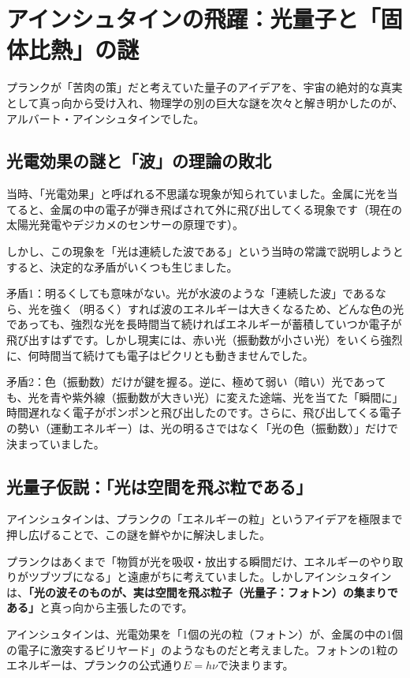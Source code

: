 \section{アインシュタインの飛躍：光量子と「固体比熱」の謎}

プランクが「苦肉の策」だと考えていた量子のアイデアを、宇宙の絶対的な真実として真っ向から受け入れ、物理学の別の巨大な謎を次々と解き明かしたのが、アルバート・アインシュタインでした。

\subsection{光電効果の謎と「波」の理論の敗北}

当時、「光電効果」と呼ばれる不思議な現象が知られていました。金属に光を当てると、金属の中の電子が弾き飛ばされて外に飛び出してくる現象です（現在の太陽光発電やデジカメのセンサーの原理です）。

しかし、この現象を「光は連続した波である」という当時の常識で説明しようとすると、決定的な矛盾がいくつも生じました。

矛盾1：明るくしても意味がない。光が水波のような「連続した波」であるなら、光を強く（明るく）すれば波のエネルギーは大きくなるため、どんな色の光であっても、強烈な光を長時間当て続ければエネルギーが蓄積していつか電子が飛び出すはずです。しかし現実には、赤い光（振動数が小さい光）をいくら強烈に、何時間当て続けても電子はピクリとも動きませんでした。

矛盾2：色（振動数）だけが鍵を握る。逆に、極めて弱い（暗い）光であっても、光を青や紫外線（振動数が大きい光）に変えた途端、光を当てた「瞬間に」時間遅れなく電子がポンポンと飛び出したのです。さらに、飛び出してくる電子の勢い（運動エネルギー）は、光の明るさではなく「光の色（振動数）」だけで決まっていました。

\subsection{光量子仮説：「光は空間を飛ぶ粒である」}

アインシュタインは、プランクの「エネルギーの粒」というアイデアを極限まで押し広げることで、この謎を鮮やかに解決しました。

プランクはあくまで「物質が光を吸収・放出する瞬間だけ、エネルギーのやり取りがツブツブになる」と遠慮がちに考えていました。しかしアインシュタインは、\textbf{「光の波そのものが、実は空間を飛ぶ粒子（光量子：フォトン）の集まりである」}と真っ向から主張したのです。

アインシュタインは、光電効果を「1個の光の粒（フォトン）が、金属の中の1個の電子に激突するビリヤード」のようなものだと考えました。フォトンの1粒のエネルギーは、プランクの公式通り\(E = h\nu\)で決まります。


